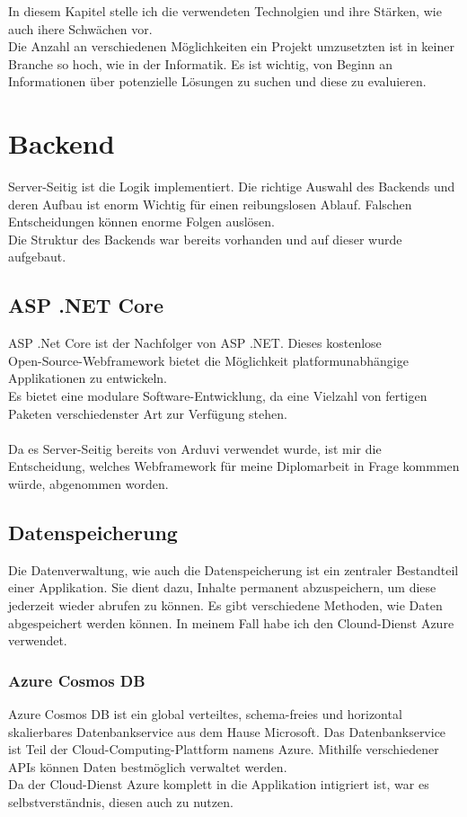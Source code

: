 In diesem Kapitel stelle ich die verwendeten Technolgien und ihre Stärken, 
wie auch ihere Schwächen vor.
\\
Die Anzahl an verschiedenen Möglichkeiten ein Projekt umzusetzten ist in keiner 
Branche so hoch, wie in der Informatik. Es ist wichtig, von Beginn an Informationen 
über potenzielle Lösungen zu suchen und diese zu evaluieren.

\section{Backend}
Server-Seitig ist die Logik implementiert. Die richtige Auswahl des Backends und deren Aufbau ist
enorm Wichtig für einen reibungslosen Ablauf. Falschen Entscheidungen können enorme Folgen auslösen.
\\
Die Struktur des Backends war bereits vorhanden und auf dieser wurde aufgebaut.

    \subsection{ASP .NET Core}
    ASP .Net Core ist der Nachfolger von ASP .NET.  Dieses kostenlose\\
    Open-Source-Webframework bietet die Möglichkeit platformunabhängige\\
    Applikationen zu entwickeln.
    \\
    Es bietet eine modulare Software-Entwicklung, da eine Vielzahl von fertigen Paketen
    verschiedenster Art zur Verfügung stehen.
    \\\\
    Da es Server-Seitig bereits von Arduvi verwendet wurde, ist mir die Entscheidung, welches
    Webframework für meine Diplomarbeit in Frage kommmen würde, abgenommen worden.

    \subsection{Datenspeicherung}
    Die Datenverwaltung, wie auch die Datenspeicherung ist ein zentraler Bestandteil
    einer Applikation. Sie dient dazu, Inhalte permanent abzuspeichern, um diese jederzeit 
    wieder abrufen zu können. Es gibt verschiedene Methoden, wie Daten abgespeichert werden können.
    In meinem Fall habe ich den Clound-Dienst Azure verwendet.

        \subsubsection{Azure Cosmos DB}
        Azure Cosmos DB ist ein global verteiltes, schema-freies und horizontal skalierbares 
        Datenbankservice aus dem Hause Microsoft. Das Datenbankservice ist Teil der Cloud-Computing-Plattform namens Azure.
        Mithilfe verschiedener APIs können Daten bestmöglich verwaltet werden.
        \\
        Da der Cloud-Dienst Azure komplett in die Applikation intigriert ist, war es selbstverständnis,
        diesen auch zu nutzen.

